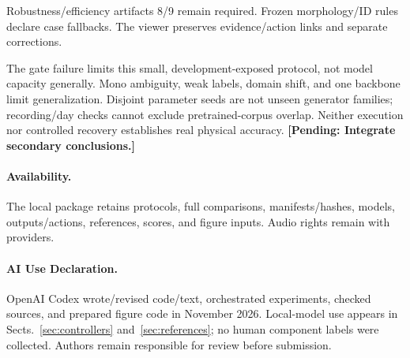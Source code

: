 \documentclass[runningheads,orivec]{llncs}
\newcommand{\pending}[1]{\iffinalresults
  \PackageError{research-results}{Unresolved result or protocol marker}{Resolve the marked item from recorded evidence before submission.}%
  \else\textbf{[Pending: #1]}\fi}
\newif\iffinalresults
\begin{document}
Robustness/efficiency artifacts 8/9 remain required. Frozen morphology/ID rules declare case fallbacks. The viewer preserves evidence/action links and separate corrections.

The gate failure limits this small, development-exposed protocol, not model capacity generally. Mono ambiguity, weak labels, domain shift, and one backbone limit generalization. Disjoint parameter seeds are not unseen generator families; recording/day checks cannot exclude pretrained-corpus overlap. Neither execution nor controlled recovery establishes real physical accuracy. \pending{Integrate secondary conclusions.}

\paragraph{Availability.} The local package retains protocols, full comparisons, manifests/hashes, models, outputs/actions, references, scores, and figure inputs. Audio rights remain with providers.

\paragraph{AI Use Declaration.} OpenAI Codex wrote/revised code/text, orchestrated experiments, checked sources, and prepared figure code in November 2026. Local-model use appears in Sects.~\ref{sec:controllers} and~\ref{sec:references}; no human component labels were collected. Authors remain responsible for review before submission.



\end{document}
